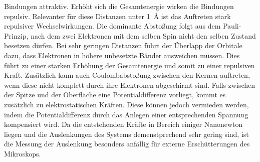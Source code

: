         Bindungen attraktiv. Erhöht sich die Gesamtenergie wirken die Bindungen repulsiv.
          Relevanter für diese Distanzen unter \SI{1}{\angstrom} ist das Auftreten stark repulsiver Wechselwirkungen. Die dominante Abstoßung folgt aus dem Pauli-Prinzip, nach dem zwei Elektronen mit dem 
          selben Spin nicht den selben Zustand besetzen dürfen. Bei sehr geringen Distanzen führt der Überlapp der Orbitale dazu, dass Elektronen in höhere unbesetzte Bänder ausweichen müssen. Dies führt zu einer 
          starken Erhöhung der Gesamtenergie und somit zu einer repulsiven Kraft. Zusätzlich kann auch Coulombabstoßung zwischen den Kernen auftreten, wenn diese nicht komplett durch ihre Elektronen 
          abgeschirmt sind.
%
          Falls zwischen der Spitze und der Oberfläche eine Potentialdifferenz vorliegt, kommt es zusätzlich zu elektrostatischen Kräften. Diese können jedoch vermieden werden, indem die Potentialdifferenz durch
          das Anlegen einer entsprechenden Spannung kompensiert wird.\newline
%
          Da die entstehenden Kräfte in Bereich einiger Nanonewton liegen und die Auslenkungen des Systems demenstprechend sehr gering sind, ist die Messung der Auslenkung besonders anfällig für externe Erschütterungen des Mikroskops.
          
        
